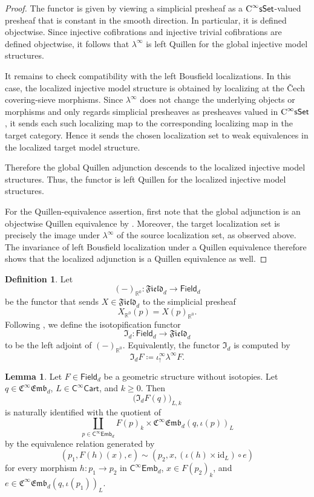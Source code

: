 \documentclass{amsart}
\newcommand{\cat}[1]{\mathsf{#1}}
\newcommand{\sset}{\cat{sSet}}
\newcommand{\id}{\mathrm{id}}
\newcommand{\CsSet}{\textnormal{C}^{\infty}\sset}
\newcommand{\field}[1]{\mathfrak{Field}_{#1}}
\newcommand{\fieldnoniso}[1]{\cat{Field}_{#1}}
\newcommand{\Cart}{\cat{C}^{\infty}\cat{Cart}}
\newcommand{\fembnoniso}[1]{\cat{C}^{\infty}\cat{Emb}_{#1}}
\newcommand{\femb}[1]{\mathfrak{C}^{\infty}\mathfrak{Emb}_{#1}}
\newcommand{\RR}{{\mathbb{R}}}
\theoremstyle{definition}
\newtheorem{definition}[equation]{Definition}
\newtheorem{lemma}[equation]{Lemma}
\numberwithin{equation}{subsection}
\numberwithin{subsubsection}{subsection}
\begin{document}
\begin{proof}
  The functor is given by viewing a simplicial presheaf as a
  \(\CsSet\)-valued presheaf that is constant in the smooth direction. In
  particular, it is defined objectwise. Since injective cofibrations and
  injective trivial cofibrations are defined objectwise, it follows that
  \(\lambda^{\infty}\) is left Quillen for the global injective model
  structures.

  It remains to check compatibility with the left Bousfield localizations. In
  this case, the localized injective model structure is obtained by localizing
  at the \v{C}ech covering-sieve morphisms.
  Since \(\lambda^\infty\) does not change the underlying objects or
  morphisms and only regards simplicial presheaves as presheaves valued in
  \(\CsSet\), it sends each such localizing map to the corresponding
  localizing map in the target category. Hence it sends the
  chosen localization set to weak equivalences in the localized target model
  structure.

  Therefore the global Quillen adjunction descends to the localized
  injective model structures. Thus, the functor is left Quillen for
  the localized injective model structures.

  For the Quillen-equivalence assertion, first note that the global
  adjunction is an objectwise Quillen equivalence by
  . Moreover, the target
  localization set is precisely the image under \(\lambda^\infty\) of the
  source localization set, as observed above. The invariance of
  left Bousfield localization under a Quillen equivalence
  \cite[Theorem~3.3.20]{Hir03} therefore shows that the localized
  adjunction is a Quillen equivalence as well.
\end{proof}

\begin{definition}\label{def:isotopification.functor}
  Let
  \[
    (-)_{\RR^0}:\field{d}\longrightarrow\fieldnoniso{d}
  \]
  be the functor that sends \(X\in\field{d}\) to the simplicial presheaf
  \[
    X_{\RR^0}(p)=X(p)_{\RR^0}.
  \]
  Following \cite{GP26}, we define the isotopification functor
  \[
    \mathfrak{I}_{d}:\fieldnoniso{d}\longrightarrow\field{d}
  \]
  to be the left adjoint of \((-)_{\RR^0}\). Equivalently, the functor
  \(\mathfrak{I}_{d}\) is computed by
  \[
    \mathfrak{I}_{d}F \coloneqq \iota^\infty_!\lambda^\infty F.
  \]
\end{definition}

\begin{lemma}\label{lem:LKE.raw.triples}
  Let \(F\in \fieldnoniso{d}\) be a geometric structure without isotopies.
  Let \(q\in \femb{d}\), \(L\in \Cart\), and \(k\geq 0\). Then
  \[
    \bigl(\mathfrak{I}_{d}F(q)\bigr)_{L,k}
  \]
  is naturally identified with the quotient of
  \[
    \coprod_{p\in \fembnoniso{d}}
    F(p)_k\times \femb{d}(q,\iota(p))_L
  \]
  by the equivalence relation generated by
  \[
    (p_1,F(h)(x),e)
    \sim
    (p_2,x,(\iota(h)\times \id_L)\circ e)
  \]
  for every morphism \(h:p_1\to p_2\) in \(\fembnoniso{d}\),
  \(x\in F(p_2)_k\), and
  \(e\in \femb{d}(q,\iota(p_1))_L\).
\end{lemma}
\end{document}
